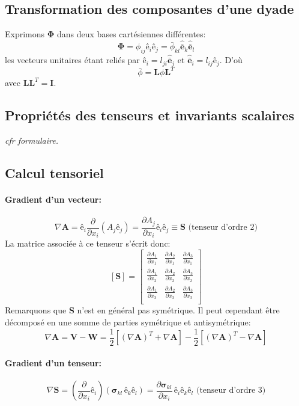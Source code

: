 \subsection{Transformation des composantes d'une dyade}
Exprimons $\mathbf{\Phi}$ dans deux bases cartésiennes différentes: $$\mathbf{\Phi}=\phi_{ij}\textbf{ê}_i\textbf{ê}_j=\bar{\phi}_{kl}\mathbf{\hat{\bar{e}}}_k\mathbf{\hat{\bar{e}}}_l$$ les vecteurs unitaires étant reliés par $\textbf{ê}_i=l_{ji}\mathbf{\hat{\bar{e}}}_j$ et $\mathbf{\hat{\bar{e}}}_i =l_{ij}\textbf{ê}_j$. D'où
$$\bar{\phi}=\textbf{L}\phi\textbf{L}^T$$ avec $\textbf{L}\textbf{L}^T=\textbf{I}$.

\subsection{Propriétés des tenseurs et invariants scalaires}
\emph{cfr formulaire.}
\subsection{Calcul tensoriel}
\paragraph{Gradient d'un vecteur:}
$$\nabla\textbf{A}=\textbf{ê}_i\frac{\partial}{\partial x_i}(A_j\textbf{ê}_j)=\frac{\partial A_j}{\partial x_i}\textbf{ê}_i\textbf{ê}_j\equiv \textbf{S}\text{ (tenseur d'ordre 2)}$$
La matrice associée à ce tenseur s'écrit donc:
$$[\textbf{S}]=\left[\begin{array}{ccc}
\frac{\partial A_1}{\partial x_1}&\frac{\partial A_2}{\partial x_1} &\frac{\partial A_3}{\partial x_1}\\
\frac{\partial A_1}{\partial x_2}&\frac{\partial A_2}{\partial x_2}&\frac{\partial A_3}{\partial x_2}\\
\frac{\partial A_1}{\partial x_3}&\frac{\partial A_2}{\partial x_3}&\frac{\partial A_3}{\partial x_3}\\
\end{array}\right]
$$
Remarquons que \textbf{S} n'est en général pas symétrique. Il peut cependant être décomposé en une somme de parties symétrique et antisymétrique:
$$\nabla \textbf{A}=\textbf{V}-\textbf{W}=\frac{1}{2}[(\nabla\textbf{A})^T+\nabla\textbf{A}]-\frac{1}{2}[(\nabla\textbf{A})^T-\nabla\textbf{A}]$$
\paragraph{Gradient d'un tenseur:}
$$\nabla\mathbf{S}=\left(\frac{\partial}{\partial x_i}\textbf{ê}_i\right)\left(\boldsymbol{\sigma}_{kl}\,\textbf{ê}_k\textbf{ê}_l\right)=\frac{\partial\boldsymbol{\sigma}_{kl}}{\partial x_i}\,\textbf{ê}_i\textbf{ê}_k\textbf{ê}_l \text{  (tenseur d'ordre 3)} $$
